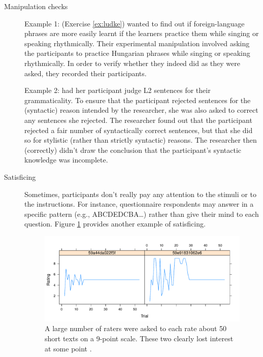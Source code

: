\documentclass[a4paper]{tufte-book}\usepackage[]{graphicx}\usepackage[]{xcolor}
\begin{document}
\begin{description}
 \item[Manipulation checks]

Example 1: \citet{Ludke2014} (Exercise \ref{ex:ludke}) wanted to find out 
  if foreign-language phrases are more easily learnt 
  if the learners practice them while singing or speaking rhythmically. 
  Their experimental manipulation involved asking the participants 
  to practice Hungarian phrases while singing or speaking rhythmically. 
  In order to verify whether they indeed did as they were asked, 
  they recorded their participants.

Example 2: \citet{Lardiere2006} had her
  participant judge L2 sentences for their grammaticality.
  To ensure that the participant rejected sentences
  for the (syntactic) reason intended by the researcher,
  she was also asked to correct any sentences she rejected.
  The researcher found out that the participant rejected
  a fair number of syntactically correct sentences, but that she
  did so for stylistic (rather than strictly syntactic)
  reasons. The researcher then (correctly) didn't draw the conclusion
  that the participant's syntactic knowledge was incomplete.

 \item[Satisficing]
 Sometimes, participants don't really pay any attention to the stimuli or to
 the instructions.
 For instance, questionnaire respondents may answer in a specific
 pattern (e.g., ABCDEDCBA\dots) rather than give their mind to each question.
 Figure \ref{fig:satisficing}
 provides another example of satisficing.

\begin{figure}
  \centering
  \includegraphics[width=\textwidth]{figure/PortugueseSatisficing}
  \caption{A large number of raters were asked to each rate about 50
  short texts on a 9-point scale. These two clearly
  lost interest at some point \citep{Vanhove_lexrich_TR}.}
  \label{fig:satisficing}
\end{figure}


\end{description}
\end{document}
